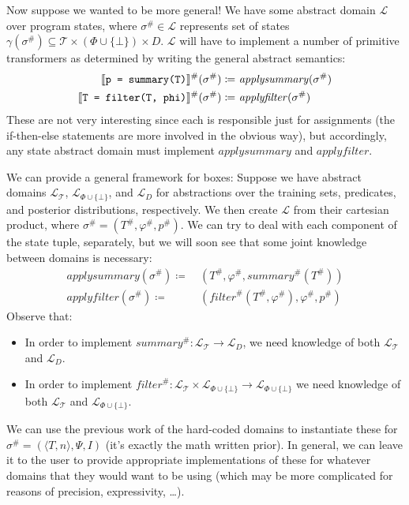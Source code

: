 Now suppose we wanted to be more general!
We have some abstract domain $\mathcal{L}$ over program states,
where $\sigma^\# \in \mathcal{L}$ represents set of states
$\gamma(\sigma^\#) \subseteq \mathcal{T} \times (\Phi\cup\{\bot\}) \times D$.
$\mathcal{L}$ will have to implement a number of primitive transformers
as determined by writing the general abstract semantics:
\begin{align*}
    \den{\summarynode}^\#(\sigma^\#) \coloneqq&~ \mathit{applysummary}(\sigma^\#) \\
    \den{\filternode}^\#(\sigma^\#) \coloneqq&~ \mathit{applyfilter}(\sigma^\#)
\end{align*}
These are not very interesting since each is responsible just for assignments
(the if-then-else statements are more involved in the obvious way),
but accordingly, any state abstract domain must implement
$\mathit{applysummary}$ and $\mathit{applyfilter}$.

We can provide a general framework for boxes:
Suppose we have abstract domains $\mathcal{L}_\mathcal{T}$,
$\mathcal{L}_{\Phi \cup \{\bot\}}$, and $\mathcal{L}_D$
for abstractions over the training sets, predicates, and posterior distributions, respectively.
We then create $\mathcal{L}$ from their cartesian product, where $\sigma^\# = (T^\#, \varphi^\#, p^\#)$.
We can try to deal with each component of the state tuple, separately,
but we will soon see that some joint knowledge between domains is necessary:
\begin{align*}
    \mathit{applysummary}(\sigma^\#) \coloneqq&~ (T^\#, \varphi^\#, \mathit{summary}^\#(T^\#)) \\
    \mathit{applyfilter}(\sigma^\#) \coloneqq&~ (\mathit{filter}^\#(T^\#, \varphi^\#), \varphi^\#, p^\#)
\end{align*}
Observe that:
\begin{itemize}
    \item In order to implement $\mathit{summary}^\# : \mathcal{L}_\mathcal{T} \rightarrow \mathcal{L}_D$,
        we need knowledge of both $\mathcal{L}_\mathcal{T}$ and $\mathcal{L}_D$.
    \item In order to implement $\mathit{filter}^\# :
        \mathcal{L}_\mathcal{T} \times \mathcal{L}_{\Phi\cup\{\bot\}} \rightarrow \mathcal{L}_{\Phi\cup\{\bot\}}$
        we need knowledge of both $\mathcal{L}_\mathcal{T}$ and $\mathcal{L}_{\Phi\cup\{\bot\}}$.
\end{itemize}
We can use the previous work of the hard-coded domains to instantiate these
for $\sigma^\# = (\langle T, n \rangle, \Psi, I)$ (it's exactly the math written prior).
In general, we can leave it to the user to provide appropriate implementations of these
for whatever domains that they would want to be using
(which may be more complicated for reasons of precision, expressivity, \ldots).


